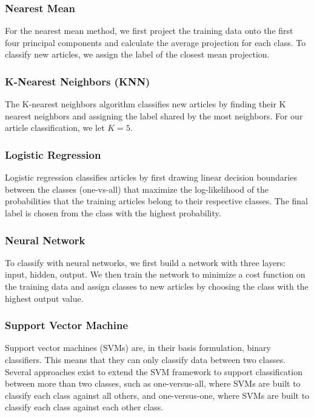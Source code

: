 \documentclass[12pt]{article}
\begin{document}
\subsubsection{Nearest Mean}

For the nearest mean method, we first project the training data onto
the first four principal components and calculate the average projection for each class. To classify new articles, we assign the label of the closest mean projection.

\subsubsection{K-Nearest Neighbors (KNN)}

The K-nearest neighbors algorithm classifies new articles by
finding their K nearest neighbors and assigning the label shared by the most neighbors. For our article classification, we let $K = 5$.

\subsubsection{Logistic Regression}

Logistic regression classifies articles by first drawing linear decision
boundaries between the classes (one-vs-all) that maximize the log-likelihood of the probabilities that the training articles belong to their respective classes. The final label is chosen from the class with the highest probability.

\subsubsection{Neural Network}

To classify with neural networks, we first build a network with three
layers: input, hidden, output. We then train the network to minimize a cost function on the training data and assign classes to new articles by choosing the class with the highest output value.

\subsubsection{Support Vector Machine}

Support vector machines (SVMs) are, in their basis formulation, binary classifiers. This means that they can only classify data between two classes. Several approaches exist to extend the SVM framework to support classification between more than two classes, such as one-versus-all, where SVMs are built to classify each class against all others, and one-versus-one, where SVMs are built to classify each class against each other class.
\end{document}
